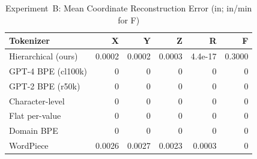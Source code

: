 \begin{table}[htbp]
\centering
\caption{Experiment~B: Mean Coordinate Reconstruction Error (in; in/min for F)}
\label{tab:exp_b_recon}
\scriptsize
\begin{tabular}{@{}lrrrrr@{}}
\toprule
\textbf{Tokenizer} & \textbf{X} & \textbf{Y} & \textbf{Z} & \textbf{R} & \textbf{F} \\
\midrule
Hierarchical (ours) & 0.0002 & 0.0002 & 0.0003 & 4.4e-17 & 0.3000 \\
GPT-4 BPE (cl100k) & 0 & 0 & 0 & 0 & 0 \\
GPT-2 BPE (r50k) & 0 & 0 & 0 & 0 & 0 \\
Character-level & 0 & 0 & 0 & 0 & 0 \\
Flat per-value & 0 & 0 & 0 & 0 & 0 \\
Domain BPE & 0 & 0 & 0 & 0 & 0 \\
WordPiece & 0.0026 & 0.0027 & 0.0023 & 0.0003 & 0 \\
\bottomrule
\end{tabular}
\normalsize
\end{table}
